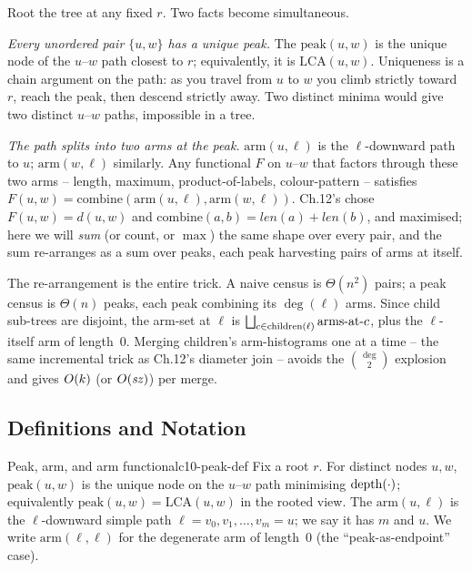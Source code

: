 Root the tree at any fixed $r$. Two facts become simultaneous.

\emph{Every unordered pair $\{u,w\}$ has a unique peak.} The $\mathrm{peak}(u,w)$ is
the unique node of the $u$--$w$ path closest to $r$; equivalently, it is
$\mathrm{LCA}(u,w)$. Uniqueness is a chain argument on the path: as you
travel from $u$ to $w$ you climb strictly toward $r$, reach the peak, then
descend strictly away. Two distinct minima would give two distinct
$u$--$w$ paths, impossible in a tree.

\emph{The path splits into two arms at the peak.} $\mathrm{arm}(u,\ell)$ is the
$\ell$-downward path to $u$; $\mathrm{arm}(w,\ell)$ similarly. Any
functional $F$ on $u$--$w$ that factors through these two arms -- length,
maximum, product-of-labels, colour-pattern -- satisfies
$F(u,w) = \mathrm{combine}(\mathrm{arm}(u,\ell),\mathrm{arm}(w,\ell))$.
Ch.12's  chose $F(u,w)=d(u,w)$ and
$\mathrm{combine}(a,b)=\mathit{len}(a)+\mathit{len}(b)$, and maximised;
here we will \emph{sum} (or count, or $\max$) the same shape over every
pair, and the sum re-arranges as a sum over peaks, each peak harvesting
pairs of arms at itself.

The re-arrangement is the entire trick. A naive census is $\Theta(n^2)$
pairs; a peak census is $\Theta(n)$ peaks, each peak combining its
$\deg(\ell)$ arms. Since child sub-trees are disjoint, the arm-set at
$\ell$ is $\bigsqcup_{c\in\operatorname{children}(\ell)}\text{arms-at-}c$, plus the
$\ell$-itself arm of length~$0$. Merging children's arm-histograms one at a
time -- the same incremental trick as Ch.12's diameter join -- avoids the
$\binom{\deg}{2}$ explosion and gives $O(k)$ (or $O(\mathit{sz})$)
per merge.

\subsection{Definitions and Notation}

\begin{definition}{Peak, arm, and arm functional}{c10-peak-def}
Fix a root $r$. For distinct nodes $u,w$, $\mathrm{peak}(u,w)$ is the
unique node on the $u$--$w$ path minimising $\operatorname{depth}(\cdot)$; equivalently
$\mathrm{peak}(u,w)=\mathrm{LCA}(u,w)$ in the rooted view. The
 $\mathrm{arm}(u,\ell)$ is the $\ell$-downward simple path
$\ell=v_0,v_1,\dots,v_m=u$; we say it has  $m$ and 
$u$. We write $\mathrm{arm}(\ell,\ell)$ for the degenerate
arm of length~$0$ (the ``peak-as-endpoint'' case).
\end{definition}

